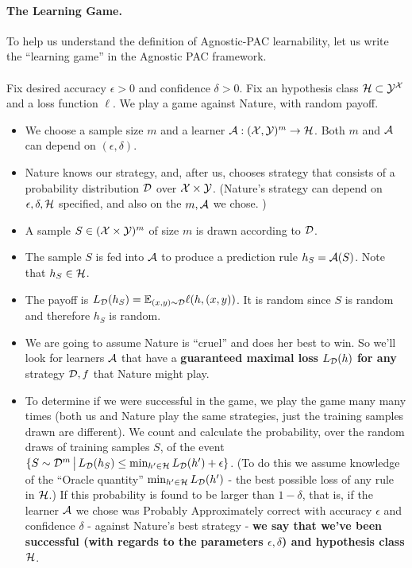 \paragraph{The Learning Game.} 
To help us understand the definition of Agnostic-PAC learnability, let us write
the ``learning game'' in the Agnostic PAC framework.
\\~\\
Fix desired accuracy $\epsilon>0$ and confidence $\delta>0$. Fix
an hypothesis class $\mathcal{H} \subset \mathcal{Y}^{\mathcal{X}}$ and a loss function $\ell$.
 We play a game against Nature, with random payoff.
  \begin{itemize}
    \item We choose a sample size $m$ and a learner $\mathcal{A}:(\mathcal{X},\mathcal{Y})^m \to \mathcal{H}$. 
    Both $m$ and $\mathcal{A}$ can depend on $(\epsilon,\delta)$.
       \item Nature knows our strategy, and, after us, chooses strategy that
         consists of a probability distribution $\mathcal{D}$ over $\mathcal{X}\times \mathcal{Y}$.
     (Nature's strategy can depend on $\epsilon,\delta,\mathcal{H}$ specified, and also
     on the $m,\mathcal{A}$ we chose. )
   \item A sample $S\in(\mathcal{X}\times\mathcal{Y})^m$ of size $m$ is drawn according to $\mathcal{D}$.
    \item The sample $S$ is fed into $\mathcal{A}$ to produce a prediction rule
      $h_S=\mathcal{A}(S)$. Note that $h_S\in\mathcal{H}$.
    \item The payoff is $L_{\mathcal{D}}(h_S)=\mathbb{E}_{(x,y)\sim\mathcal{D}}\ell(h,(x,y))$. It is random since $S$ is random and
      therefore $h_S$ is random.
    \item We are going to assume Nature is ``cruel'' and does her best to win.
      So we'll look for learners $\mathcal{A}$ that have a {\bf guaranteed maximal 
      loss} $L_{\mathcal{D}}(h)$ {\bf for any} strategy $\mathcal{D},f$ that Nature might play.
      \item To determine if we were successful in the game, we play the game many many times 
      (both us and Nature play the same strategies, just the training samples drawn are different).
      We count and calculate the probability, over the random draws of training samples $S$, of the event
      $\{ S \sim \mathcal{D}^m \,\big |\,L_{\mathcal{D}}(h_S)\leq \min_{h'\in\mathcal{H}}L_{\mathcal{D}}(h') +
      \epsilon \}$. (To do this we assume knowledge of the ``Oracle quantity''
        $\min_{h'\in\mathcal{H}}L_{\mathcal{D}}(h')$ - the best possible loss of any rule in
      $\mathcal{H}$.) If this probability is found to be 
      larger than $1-\delta$, that is, if 
      the learner $\mathcal{A}$ we chose was Probably Approximately correct with accuracy $\epsilon$ and confidence $\delta$ - against Nature's best strategy - {\bf we say that we've been successful (with regards to the parameters $\epsilon,\delta$) and hypothesis class $\mathcal{H}$}.
\end{itemize}


